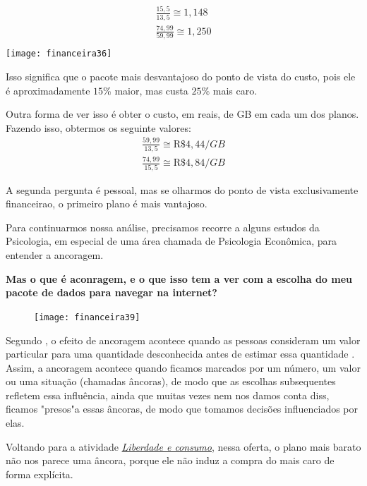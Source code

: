 \setlength{\columnsep}{-1cm}
\begin{multicols}{2}

\null\vfill
\begin{align*}
\frac{15{,}5}{13{,}5}\cong1{,}148\\
\frac{74{,}99}{59{,}99}\cong1{,}250\\
\end{align*}
\vfill\null
\flushleft
\texttt{[image: financeira36]}
\end{multicols}

Isso significa que o pacote mais desvantajoso do ponto de vista do custo, pois ele é aproximadamente $15$\% maior, mas custa $25\%$ mais caro.

\clearpage
Outra forma de ver isso é obter o custo, em reais, de GB em cada um dos planos. Fazendo isso, obtermos os seguinte valores:
\begin{align*}
\frac{59{,}99}{13{,}5}\cong\text{R\$ }4{,}44/GB\\
\frac{74{,}99}{15{,}5}\cong\text{R\$ }4{,}84/GB
\end{align*}

A segunda pergunta é pessoal, mas se olharmos do ponto de vista exclusivamente financeirao, o primeiro plano é mais vantajoso.

Para continuarmos nossa análise, precisamos recorre a alguns estudos da Psicologia, em especial de uma área chamada de Psicologia Econômica, para entender a ancoragem. 

\textbf{Mas o que é aconragem, e o que isso tem a ver com a escolha do meu pacote de dados para navegar na internet?}

\setlength{\columnsep}{18pt}
\begin{figure}
\vspace{-1em}
\texttt{[image: financeira39]}

\end{figure}

Segundo \cite{kahneman2012}, o efeito de ancoragem acontece quando as pessoas consideram um valor particular para uma quantidade desconhecida antes de estimar essa quantidade \citep[p. 152]{kahneman2012}. Assim, a ancoragem acontece quando ficamos marcados por um número, um valor ou uma situação (chamadas âncoras), de modo que as escolhas subsequentes refletem essa influência, ainda que muitas vezes nem nos damos conta diss, ficamos "presos"a essas âncoras, de modo que tomamos decisões influenciados por elas.

Voltando para a atividade \hyperref[fin-ativ-37]{\textit{Liberdade e consumo}}, nessa oferta, o plano mais barato não nos parece uma âncora, porque ele não induz a compra do mais caro de forma explícita. 

